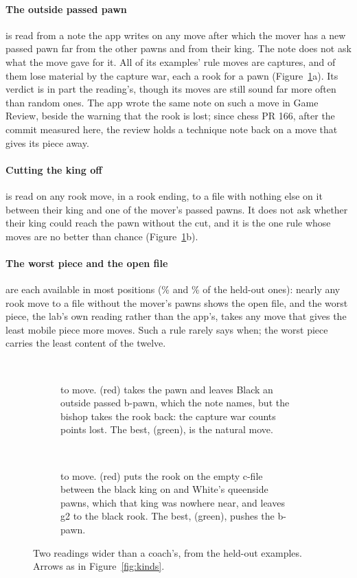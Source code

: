 \documentclass[11pt]{article}
\begin{document}
\paragraph{The outside passed pawn} is read from a note the app writes on any move after which the
mover has a new passed pawn far from the other pawns and from their king. The note does not ask what
the move gave for it. All \OpCaptures{} of its examples' rule moves are captures, and \OpLosing{} of
them lose material by the capture war, each a rook for a pawn (Figure~\ref{fig:wide}a). Its verdict is in part the reading's, though its moves are still sound far
more often than random ones. The app wrote the same note on such a move in Game Review, beside the
warning that the rook is lost; since chess PR 166, after the commit measured here, the review holds a
technique note back on a move that gives its piece away.

\paragraph{Cutting the king off} is read on any rook move, in a rook ending, to a file with nothing
else on it between their king and one of the mover's passed pawns. It does not ask whether their
king could reach the pawn without the cut, and it is the one rule whose moves are no better than
chance (Figure~\ref{fig:wide}b).

\paragraph{The worst piece and the open file} are each available in most positions (\WorstAvail\%
and \OpenAvail\% of the held-out ones): nearly any rook move to a file without the mover's pawns
shows the open file, and the worst piece, the lab's own reading rather than the app's, takes any move
that gives the least mobile piece more moves. Such a rule rarely says when; the worst piece carries
the least content of the twelve.

\begin{figure}[ht]
\centering
\begin{subfigure}[t]{0.48\textwidth}
\centering
\FdBoard\\[0.3em]
{\footnotesize \FdFen}
\caption{\FdMover{} to move. \FdR{} (red) takes the pawn and leaves Black an outside passed b-pawn,
which the note names, but the bishop takes the rook back: the capture war counts \FdLoss{} points
lost. The best, \FdBest{} (green), is the natural move.}
\end{subfigure}\hfill
\begin{subfigure}[t]{0.48\textwidth}
\centering
\FeBoard\\[0.3em]
{\footnotesize \FeFen}
\caption{\FeMover{} to move. \FeR{} (red) puts the rook on the empty c-file between the black king
on \FeKing{} and White's queenside pawns, which that king was nowhere near, and leaves g2 to the black
rook. The best, \FeBest{} (green), pushes the b-pawn.}
\end{subfigure}
\caption{Two readings wider than a coach's, from the held-out examples. Arrows as in
Figure~\ref{fig:kinds}.}
\label{fig:wide}
\end{figure}
\end{document}
